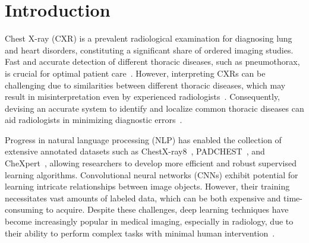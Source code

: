 \documentclass[review,1p,times,numbers]{elsarticle}
\begin{document}
\section{Introduction}\label{sec:taxonomy.introduction}
Chest X-ray (CXR) is a prevalent radiological examination for diagnosing lung and heart disorders, constituting a significant share of ordered imaging studies. Fast and accurate detection of different thoracic diseases, such as pneumothorax, is crucial for optimal patient care~\cite{bellaviti_Increased_2016}. However, interpreting CXRs can be challenging due to similarities between different thoracic diseases, which may result in misinterpretation even by experienced radiologists~\cite{delrue_Difficulties_2011}. Consequently, devising an accurate system to identify and localize common thoracic diseases can aid radiologists in minimizing diagnostic errors~\cite{crisp_Global_2014,silverstein_Most_2016}.

Progress in natural language processing (NLP) has enabled the collection of extensive annotated datasets such as ChestX-ray8~\cite{wang_ChestXRay8_2017}, PADCHEST~\cite{bustos_Padchest_2020}, and CheXpert~\cite{irvin_CheXpert_2019}, allowing researchers to develop more efficient and robust supervised learning algorithms. Convolutional neural networks (CNNs) exhibit potential for learning intricate relationships between image objects. However, their training necessitates vast amounts of labeled data, which can be both expensive and time-consuming to acquire. Despite these challenges, deep learning techniques have become increasingly popular in medical imaging, especially in radiology, due to their ability to perform complex tasks with minimal human intervention~\cite{jaderberg_Spatial_2015}.
\end{document}
